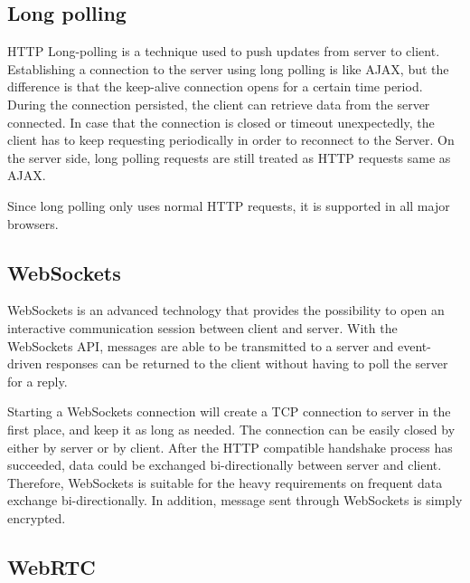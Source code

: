 



\subsection{Long polling}
HTTP Long-polling is a technique used to push updates from server to client. Establishing a connection to the server using long polling is like AJAX, but the difference is that the keep-alive connection opens for a certain time period. During the connection persisted, the client can retrieve data from the server connected. In case that the connection is closed or timeout unexpectedly, the client has to keep requesting periodically in order to reconnect to the Server. On the server side, long polling requests are still treated as HTTP requests same as AJAX. 

Since long polling only uses normal HTTP requests, it is supported in all major browsers.


\subsection{WebSockets}

WebSockets is an advanced technology that provides the possibility to open an interactive communication session between client and server\cite{Websocket}. With the WebSockets API, messages are able to be transmitted to a server and event-driven responses can be returned to the client without having to poll the server for a reply.

Starting a WebSockets connection will create a TCP connection to server in the first place, and keep it as long as needed. The connection can be easily closed by either by server or by client. After the HTTP compatible handshake process has succeeded,  data could be exchanged bi-directionally between server and client. Therefore, WebSockets is suitable for the heavy requirements on frequent data exchange bi-directionally. In addition, message sent through WebSockets is simply encrypted\cite{pimentel2012communicating}.


\subsection{WebRTC}

